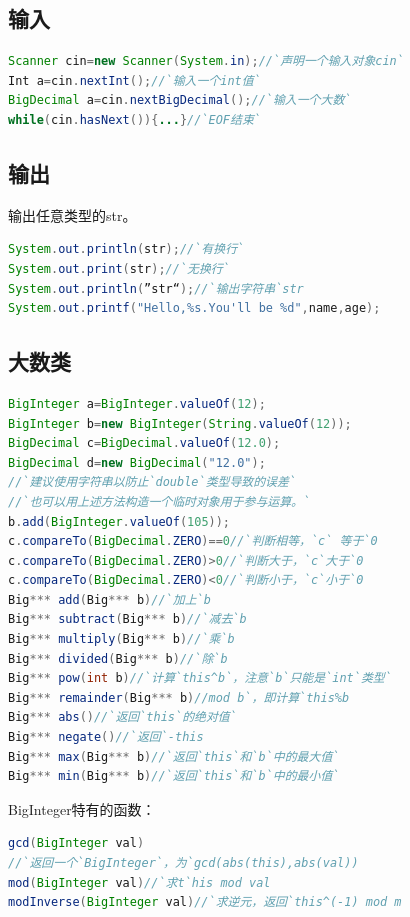\documentclass[UTF8,a4paper,titlepage]{ctexart}
\begin{document}
        \subsection{输入}
\begin{lstlisting}[language=Java]
Scanner cin=new Scanner(System.in);//`声明一个输入对象cin`
Int a=cin.nextInt();//`输入一个int值`
BigDecimal a=cin.nextBigDecimal();//`输入一个大数`
while(cin.hasNext()){...}//`EOF结束`
\end{lstlisting}
        \subsection{输出}
            输出任意类型的str。
\begin{lstlisting}[language=Java]
System.out.println(str);//`有换行`
System.out.print(str);//`无换行`
System.out.println(”str“);//`输出字符串`str
System.out.printf("Hello,%s.You'll be %d",name,age);
\end{lstlisting}
        \subsection{大数类}
\begin{lstlisting}[language=Java]
BigInteger a=BigInteger.valueOf(12);
BigInteger b=new BigInteger(String.valueOf(12));
BigDecimal c=BigDecimal.valueOf(12.0);
BigDecimal d=new BigDecimal("12.0");
//`建议使用字符串以防止`double`类型导致的误差`
//`也可以用上述方法构造一个临时对象用于参与运算。`
b.add(BigInteger.valueOf(105));
c.compareTo(BigDecimal.ZERO)==0//`判断相等，`c` 等于`0
c.compareTo(BigDecimal.ZERO)>0//`判断大于，`c`大于`0
c.compareTo(BigDecimal.ZERO)<0//`判断小于，`c`小于`0
Big*** add(Big*** b)//`加上`b
Big*** subtract(Big*** b)//`减去`b
Big*** multiply(Big*** b)//`乘`b
Big*** divided(Big*** b)//`除`b
Big*** pow(int b)//`计算`this^b`，注意`b`只能是`int`类型`
Big*** remainder(Big*** b)//mod b`，即计算`this%b
Big*** abs()//`返回`this`的绝对值`
Big*** negate()//`返回`-this
Big*** max(Big*** b)//`返回`this`和`b`中的最大值`
Big*** min(Big*** b)//`返回`this`和`b`中的最小值`
\end{lstlisting}
BigInteger特有的函数：
\begin{lstlisting}[language=Java]
gcd(BigInteger val)
//`返回一个`BigInteger`，为`gcd(abs(this),abs(val))
mod(BigInteger val)//`求t`his mod val
modInverse(BigInteger val)//`求逆元，返回`this^(-1) mod m
\end{lstlisting}
\end{document}
